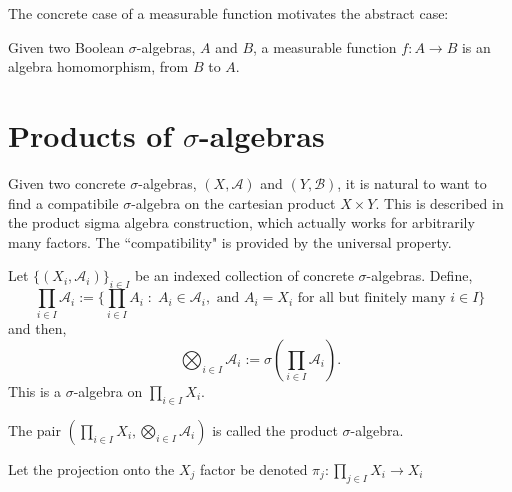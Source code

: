\documentclass{owmaths}
\begin{document}
The concrete case of a measurable function motivates the abstract case:
\begin{definition}
    Given two Boolean $\sigma$-algebras, $A$ and $B$, a measurable function 
    $f:A\rightarrow B$ is an algebra homomorphism, from $B$ to $A$.
\end{definition}


\section{Products of $\sigma$-algebras}
Given two concrete $\sigma$-algebras, $(X,\mathcal{A})$ and $(Y,\mathcal{B})$,
it is natural to want to find a compatibile $\sigma$-algebra on the
cartesian product $X \times Y$. This is described in the product sigma
algebra construction, which actually works for arbitrarily many factors.
The ``compatibility" is provided by the universal property. 
\begin{definition}
    Let $\{(X_i,\mathcal{A}_i)\}_{i\in I}$ be an indexed collection of concrete
    $\sigma$-algebras. Define,
    \begin{equation*}
        \prod_{i \in I} \mathcal{A}_i := \{ \prod_{i \in I} A_i\;:\;A_i \in \mathcal{A}_i,\text{ and }A_i = X_i\text{ for all but finitely many }i \in I\}
    \end{equation*}
    and then,
    \begin{equation*}
        \bigotimes_{i \in I} \mathcal{A}_i := \sigma\left(\prod_{i \in I} \mathcal{A}_i\right).
    \end{equation*}
    This is a $\sigma$-algebra on $\prod_{i\in I} X_i$.
    
    The pair $\left(\prod_{i \in I} X_i,\bigotimes_{i \in I} \mathcal{A}_i\right)$ is 
    called the product $\sigma$-algebra.
    
    Let the projection onto the $X_j$ factor be denoted $\pi_j:\prod_{j \in I} X_i \rightarrow X_i$
\end{definition}
\end{document}
